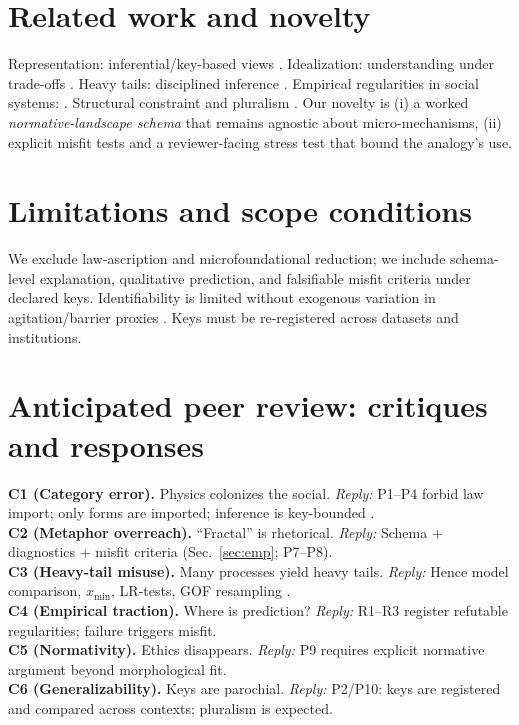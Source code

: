 \documentclass[sn-basic,referee,pdflatex]{sn-jnl}
\begin{document}
\section{Related work and novelty}\label{sec:related}
Representation: inferential/key-based views \citep{Suarez2004,FriggNguyen2016,Contessa2007}. Idealization: understanding under trade-offs \citep{Potochnik2017}. Heavy tails: disciplined inference \citep{Newman2005,ClausetShaliziNewman2009,Mitzenmacher2004,Simon1955}. Empirical regularities in social systems: \citep{Zipf1949,Gabaix1999,Axtell2001,BarabasiAlbert1999}. Structural constraint and pluralism \citep{LadymanRoss2007,Wimsatt2007,Batterman2002}. Our novelty is (i) a worked \emph{normative-landscape schema} that remains agnostic about micro-mechanisms, (ii) explicit misfit tests and a reviewer-facing stress test that bound the analogy’s use.

\section{Limitations and scope conditions}\label{sec:limits2}
We exclude law-ascription and microfoundational reduction; we include schema-level explanation, qualitative prediction, and falsifiable misfit criteria under declared keys. Identifiability is limited without exogenous variation in agitation/barrier proxies . Keys must be re-registered across datasets and institutions.

\section{Anticipated peer review: critiques and responses}\label{sec:peerreview}
\textbf{C1 (Category error).} Physics colonizes the social. \emph{Reply:} P1--P4 forbid law import; only forms are imported; inference is key-bounded \citep{Suarez2004,FriggNguyen2016}.\\[2pt]
\textbf{C2 (Metaphor overreach).} “Fractal” is rhetorical. \emph{Reply:} Schema + diagnostics + misfit criteria (Sec.~\ref{sec:emp}; P7--P8).\\[2pt]
\textbf{C3 (Heavy-tail misuse).} Many processes yield heavy tails. \emph{Reply:} Hence model comparison, \(x_{\min}\), LR-tests, GOF resampling \citep{ClausetShaliziNewman2009,Newman2005}.\\[2pt]
\textbf{C4 (Empirical traction).} Where is prediction? \emph{Reply:} R1--R3 register refutable regularities; failure triggers misfit.\\[2pt]
\textbf{C5 (Normativity).} Ethics disappears. \emph{Reply:} P9 requires explicit normative argument beyond morphological fit.\\[2pt]
\textbf{C6 (Generalizability).} Keys are parochial. \emph{Reply:} P2/P10: keys are registered and compared across contexts; pluralism is expected.
\end{document}
